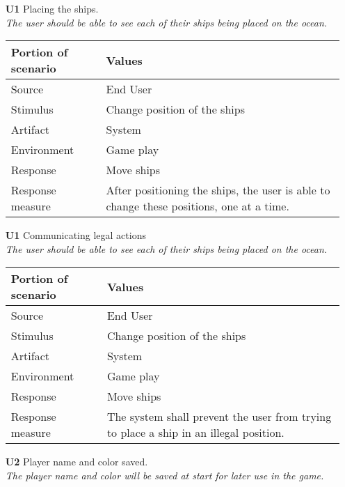    \begin{itemize}
        \item[\textbf{U1}] Placing the ships. \\
        \textit{\small{The user should be able to see each of their ships being placed on the ocean.}}
        
        \begin{tabular}{| l | l |}
            \hline
            \rowcolor[gray]{0.8}
            \textbf{Portion of scenario} & \textbf{Values} \\
            \hline
            Source & End User \\
            Stimulus & Change position of the ships \\
            Artifact & System \\
            Environment & Game play \\
            Response & Move ships  \\
            Response measure & After positioning the ships, the user is able to change these positions, one at a time. \\
            \hline
        \end{tabular}

        \item[\textbf{U1}] Communicating legal actions \\
        \textit{\small{The user should be able to see each of their ships being placed on the ocean.}}
        
        \begin{tabular}{| l | l |}
            \hline
            \rowcolor[gray]{0.8}
            \textbf{Portion of scenario} & \textbf{Values} \\
            \hline
            Source & End User \\
            Stimulus & Change position of the ships \\
            Artifact & System \\
            Environment & Game play \\
            Response & Move ships  \\
            Response measure & The system shall prevent the user from trying to place a ship in an illegal position. \\
            \hline
        \end{tabular}

        \item[\textbf{U2}] Player name and color saved. \\
        \textit{\small{The player name and color will be saved at start for later use in the game.}}
        

\end{itemize}

